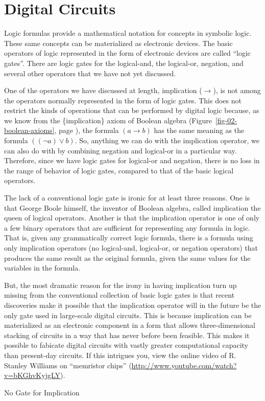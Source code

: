 \section{Digital Circuits}

Logic formulas provide a mathematical notation for concepts in symbolic logic.
These same concepts can be materialized as electronic devices.
The basic operators of logic represented in the form of electronic devices
are called ``logic gates''.
There are logic gates for the logical-and, the logical-or, negation, and
several other operators that we have not yet discussed.

\begin{aside}
One of the operators we have discussed at length, implication
($\rightarrow$), is not among the operators normally represented
in the form of logic gates. This does not restrict the kinds of
operations that can be performed by digital logic because,
as we know from the \{implication\} axiom of Boolean algebra
(Figure~\ref{fig-02-boolean-axioms}, page \pageref{fig-02-boolean-axioms}),
the formula $(a \rightarrow b)$ has the same meaning as the
formula $((\neg a) \vee b)$. So, anything we can do with
the implication operator, we can also do with by combining
negation and logical-or in a particular way.
Therefore, since we have logic gates for logical-or and negation,
there is no loss in the range of behavior of logic
gates, compared to that of the basic logical operators.

The lack of a conventional logic gate is ironic for at least three reasons.
One is that George Boole himself, the inventor of Boolean algebra,
called implication the queen of logical operators.
Another is that the implication operator is one of only a few binary operators
that are sufficient for representing any formula in logic. That is, given
any grammatically correct logic formula, there is a formula using only
implication operators (no logical-and, logical-or, or negation operators)
that produces the same result as the original formula, given the same
values for the variables in the formula.

But, the most dramatic reason for the irony in having implication
turn up missing from the conventional collection of basic logic gates
is that recent discoveries make it possible that the
implication operator will in the future be the only gate used in
large-scale digital circuits.
This is because implication can be materialized
as an electronic component in a form that allows three-dimensional
stacking of circuits in a way that has never before been feasible.
This makes it possible to fabicate digital circuits with vastly greater
computational capacity than present-day circuits.
If this intrigues you, view the online video of
R. Stanley Williams on ``memristor chips''
(\url{http://www.youtube.com/watch?v=bKGhvKyjgLY}).
\caption{No Gate for Implication}
\label{no-implication-gate}
\end{aside}

